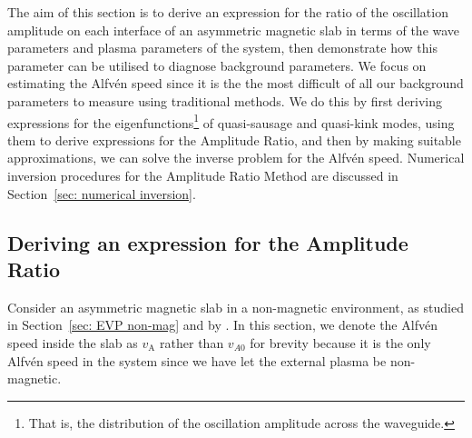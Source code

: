\documentclass[12pt]{../style-files/ociamthesis}
\begin{document}
The aim of this section is to derive an expression for the ratio of the oscillation amplitude on each interface of an asymmetric magnetic slab in terms of the wave parameters and plasma parameters of the system, then demonstrate how this parameter can be utilised to diagnose background parameters. We focus on estimating the Alfv\'{e}n speed since it is the the most difficult of all our background parameters to measure using traditional methods. We do this by first deriving expressions for the eigenfunctions\footnote{That is, the distribution of the oscillation amplitude across the waveguide.} of quasi-sausage and quasi-kink modes, using them to derive expressions for the Amplitude Ratio, and then by making suitable approximations, we can solve the inverse problem for the Alfv\'{e}n speed. Numerical inversion procedures for the Amplitude Ratio Method are discussed in Section~\ref{sec: numerical inversion}.

\subsection{Deriving an expression for the Amplitude Ratio} \label{sec: AR derivation}

Consider an asymmetric magnetic slab in a non-magnetic environment, as studied in Section~\ref{sec: EVP non-mag} and by \cite{all_etal17}. In this section, we denote the Alfv\'{e}n speed inside the slab as $v_\textrm{A}$ rather than $v_{A0}$ for brevity because it is the only Alfv\'{e}n speed in the system since we have let the external plasma be non-magnetic.
\end{document}
